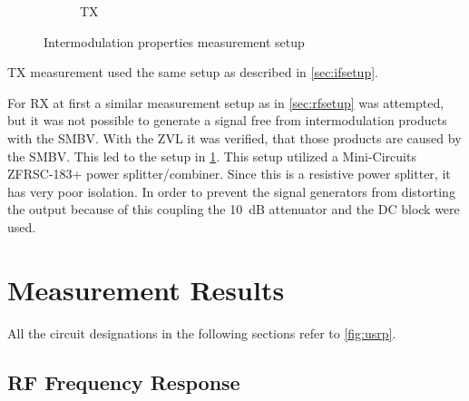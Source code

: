 \documentclass[12pt,a4paper,parskip=full]{scrartcl}
\begin{document}
\begin{figure}[htb]
    \begin{subfigure}[t]{.5\linewidth}
        \centering
        \caption{TX}
    \end{subfigure}
    \caption{Intermodulation properties measurement setup}
    \label{fig:imsetup}
\end{figure}
TX measurement used the same setup as described in \cref{sec:ifsetup}.

For RX at first a similar measurement setup as in \cref{sec:rfsetup} was attempted,
but it was not possible to generate a signal free from intermodulation products with
the SMBV. With the ZVL it was verified, that those products are caused by the
SMBV. This led to the setup in \cref{fig:imsetup}. This setup utilized a Mini-Circuits
ZFRSC-183+ power splitter/combiner. Since this is a resistive power splitter, it has
very poor isolation\cite{pwrsplit}. In order to prevent the signal generators from
distorting the output because of this coupling the \SI{10}{\deci\bel} attenuator
and the DC block were used.
\section{Measurement Results}
All the circuit designations in the following sections refer to \cref{fig:usrp}.
\subsection{RF Frequency Response}
\end{document}
